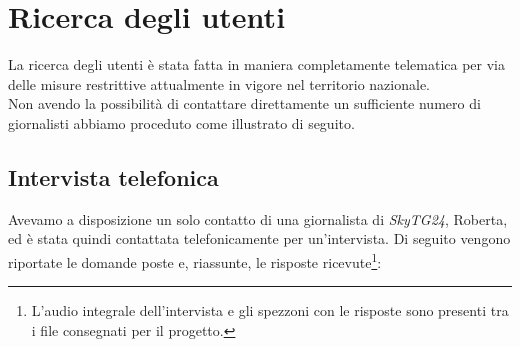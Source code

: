 \section{Ricerca degli utenti}
La ricerca degli utenti è stata fatta in maniera completamente telematica per via delle misure restrittive attualmente in vigore nel territorio nazionale.\\
Non avendo la possibilità di contattare direttamente un sufficiente numero di giornalisti abbiamo proceduto come illustrato di seguito.

\subsection{Intervista telefonica}
Avevamo a disposizione un solo contatto di una giornalista di \textit{SkyTG24}, Roberta, ed è stata quindi contattata telefonicamente per un'intervista.
Di seguito vengono riportate le domande poste e, riassunte, le risposte ricevute\footnote{L'audio integrale dell'intervista e gli spezzoni con le risposte sono presenti tra i file consegnati per il progetto.}:
